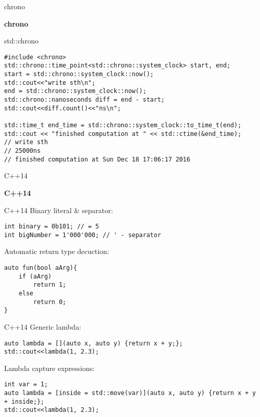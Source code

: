 \documentclass{beamer}
\begin{document}
\begin{frame}[fragile]{chrono}
\begin{center}
{\Huge \textbf{chrono}}
\end{center}
\end{frame}

\begin{frame}[fragile]{std::chrono}
\begin{lstlisting}[style=customcpp]
#include <chrono>
std::chrono::time_point<std::chrono::system_clock> start, end;
start = std::chrono::system_clock::now();
std::cout<<"write sth\n";
end = std::chrono::system_clock::now();
std::chrono::nanoseconds diff = end - start;
std::cout<<diff.count()<<"ns\n";

std::time_t end_time = std::chrono::system_clock::to_time_t(end);
std::cout << "finished computation at " << std::ctime(&end_time);
// write sth
// 25000ns
// finished computation at Sun Dec 18 17:06:17 2016
\end{lstlisting}
\end{frame}

\begin{frame}[fragile]{C++14}
\begin{center}
{\Huge \textbf{C++14}}
\end{center}
\end{frame}

\begin{frame}[fragile]{C++14}
Binary literal \& separator:
\begin{lstlisting}[style=customcpp]
int binary = 0b101; // = 5
int bigNumber = 1'000'000; // ' - separator
\end{lstlisting}
Automatic return type decuction:
\begin{lstlisting}[style=customcpp]
auto fun(bool aArg){
	if (aArg)
		return 1;
	else
		return 0;
}
\end{lstlisting}
\end{frame}

\begin{frame}[fragile]{C++14}
Generic lambda:
\begin{lstlisting}[style=customcpp]
auto lambda = [](auto x, auto y) {return x + y;};
std::cout<<lambda(1, 2.3);
\end{lstlisting}
Lambda capture expressions:
\begin{lstlisting}[style=customcpp]
int var = 1;
auto lambda = [inside = std::move(var)](auto x, auto y) {return x + y + inside;};
std::cout<<lambda(1, 2.3);
\end{lstlisting}
\end{frame}
\end{document}
